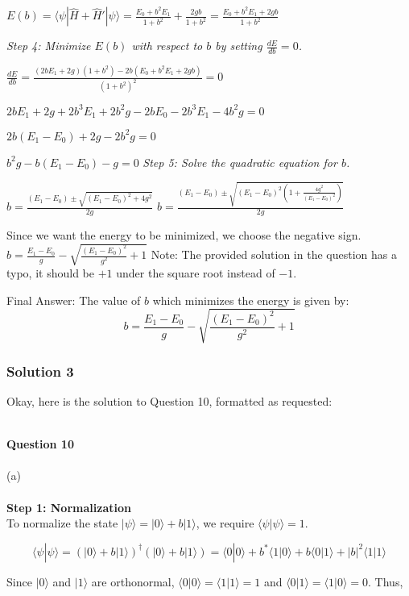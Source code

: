 \documentclass{article}
\begin{document}
$E(b) = \langle\psi|\hat{H} + \hat{H}'|\psi\rangle = \frac{E_0 + b^2E_1}{1+b^2} + \frac{2gb}{1+b^2} = \frac{E_0 + b^2E_1 + 2gb}{1+b^2}$

\textit{Step 4: Minimize $E(b)$ with respect to $b$ by setting $\frac{dE}{db} = 0$.}

$\frac{dE}{db} = \frac{(2bE_1 + 2g)(1+b^2) - 2b(E_0 + b^2E_1 + 2gb)}{(1+b^2)^2} = 0$

$2bE_1 + 2g + 2b^3E_1 + 2b^2g - 2bE_0 - 2b^3E_1 - 4b^2g = 0$

$2b(E_1 - E_0) + 2g - 2b^2g = 0$

$b^2g - b(E_1 - E_0) - g = 0$
\textit{Step 5: Solve the quadratic equation for $b$.}

$b = \frac{(E_1 - E_0) \pm \sqrt{(E_1 - E_0)^2 + 4g^2}}{2g}$
$b = \frac{(E_1 - E_0) \pm \sqrt{(E_1 - E_0)^2(1+\frac{4g^2}{(E_1-E_0)^2})}}{2g}$

Since we want the energy to be minimized, we choose the negative sign.
$b = \frac{E_1-E_0}{g} - \sqrt{\frac{(E_1-E_0)^2}{g^2} + 1}$
Note: The provided solution in the question has a typo, it should be \(+1\) under the square root instead of \(-1\).

Final Answer: The value of $b$ which minimizes the energy is given by:
\[
b = \frac{E_1 - E_0}{g} - \sqrt{\frac{(E_1 - E_0)^2}{g^2} + 1}
\]

\subsubsection{Solution 3}
Okay, here is the solution to Question 10, formatted as requested:

\noindent \\
\textbf{Question 10} \\

\noindent \\
\noindent (a) \\

\noindent \\
\textbf{Step 1: Normalization} \\
To normalize the state \(|\psi\rangle = |0\rangle + b |1\rangle\), we require \(\langle\psi|\psi\rangle = 1\).

\[
\langle\psi|\psi\rangle = (|0\rangle + b|1\rangle)^\dagger(|0\rangle + b|1\rangle) = \langle 0|0\rangle + b^*\langle 1|0\rangle + b\langle 0|1\rangle + |b|^2 \langle 1|1\rangle
\]

Since \( |0\rangle \) and \( |1\rangle \) are orthonormal, \( \langle 0|0\rangle = \langle 1|1\rangle = 1 \) and \( \langle 0|1\rangle = \langle 1|0\rangle = 0 \). Thus,
\end{document}
